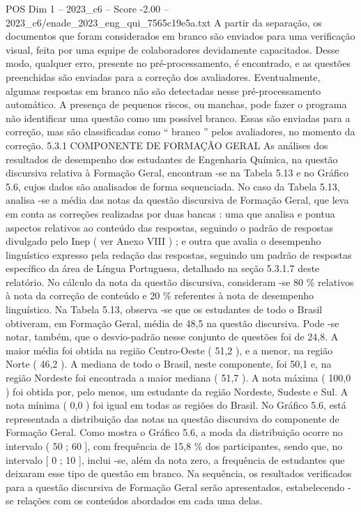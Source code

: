\begin{textsample}{POS Dim 1 – 2023\_c6 – Score -2.00 – 2023\_c6/enade\_2023\_eng\_qui\_7565c19e5a.txt}
A partir da separação, os documentos que foram considerados em branco são enviados para uma verificação visual, feita por uma equipe de colaboradores devidamente capacitados.
Desse modo, qualquer erro, presente no pré-processamento, é encontrado, e as questões preenchidas são enviadas para a correção dos avaliadores.
Eventualmente, algumas respostas em branco não são detectadas nesse pré-processamento automático.
A presença de pequenos riscos, ou manchas, pode fazer o programa não identificar uma questão como um possível branco.
Essas são enviadas para a correção, mas são classificadas como “ branco ” pelos avaliadores, no momento da correção. 5.3.1 COMPONENTE DE FORMAÇÃO GERAL As análises dos resultados de desempenho dos estudantes de Engenharia Química, na questão discursiva relativa à Formação Geral, encontram -se na Tabela 5.13 e no Gráfico 5.6, cujos dados são analisados de forma sequenciada.
No caso da Tabela 5.13, analisa -se a média das notas da questão discursiva de Formação Geral, que leva em conta as correções realizadas por duas bancas : uma que analisa e pontua aspectos relativos ao conteúdo das respostas, seguindo o padrão de respostas divulgado pelo Inep ( ver Anexo VIII ) ; e outra que avalia o desempenho linguístico expresso pela redação das respostas, seguindo um padrão de respostas específico da área de Língua Portuguesa, detalhado na seção 5.3.1.7 deste relatório.
No cálculo da nota da questão discursiva, consideram -se 80 \% relativos à nota da correção de conteúdo e 20 \% referentes à nota de desempenho linguístico.
Na Tabela 5.13, observa -se que os estudantes de todo o Brasil obtiveram, em Formação Geral, média de 48,5 na questão discursiva.
Pode -se notar, também, que o desvio-padrão nesse conjunto de questões foi de 24,8.
A maior média foi obtida na região Centro-Oeste ( 51,2 ), e a menor, na região Norte ( 46,2 ).
A mediana de todo o Brasil, neste componente, foi 50,1 e, na região Nordeste foi encontrada a maior mediana ( 51,7 ).
A nota máxima ( 100,0 ) foi obtida por, pelo menos, um estudante da região Nordeste, Sudeste e Sul.
A nota mínima ( 0,0 ) foi igual em todas as regiões do Brasil.
No Gráfico 5.6, está representada a distribuição das notas na questão discursiva do componente de Formação Geral.
Como mostra o Gráfico 5.6, a moda da distribuição ocorre no intervalo ( 50 ; 60 ], com frequência de 15,8 \% dos participantes, sendo que, no intervalo [ 0 ; 10 ], inclui -se, além da nota zero, a frequência de estudantes que deixaram esse tipo de questão em branco.
Na sequência, os resultados verificados para a questão discursiva de Formação Geral serão apresentados, estabelecendo -se relações com os conteúdos abordados em cada uma delas.

\end{textsample}
